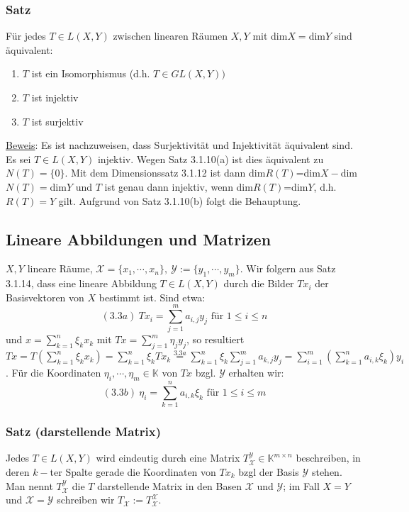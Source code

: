 \subsubsection{Satz}
Für jedes $T\in L(X,Y)$ zwischen linearen Räumen $X,Y$ mit dim$X=$dim$Y$ sind äquivalent:
\renewcommand{\labelenumi}{(\alph{enumi})}
\begin{enumerate}
\item $T$ ist ein Isomorphismus (d.h. $T\in GL(X,Y))$
\item $T$ ist injektiv
\item $T$ ist surjektiv
\end{enumerate}
\underline{Beweis}: Es ist nachzuweisen, dass Surjektivität und Injektivität äquivalent sind.  Es sei $T\in L(X,Y)$ injektiv.  Wegen Satz 3.1.10(a) ist dies äquivalent zu $N(T)=\{0\}$.  Mit dem Dimensionssatz 3.1.12 ist dann dim$R(T)$=dim$X-$dim$N(T)=$dim$Y$ und $T$ ist genau dann injektiv, wenn dim$R(T)$=dim$Y$, d.h. $R(T)=Y$ gilt.  Aufgrund von Satz 3.1.10(b) folgt die Behauptung.
\subsection{Lineare Abbildungen und Matrizen}
$X,Y$ lineare Räume, $\mathcal{X}=\{x_1,\cdots ,x_n\},\ \mathcal{Y}:=\{y_1,\cdots ,y_m\}$.  Wir folgern aus Satz 3.1.14, dass eine lineare Abbildung $T\in L(X,Y)$ durch die Bilder $Tx_i$ der Basisvektoren von $X$ bestimmt ist.  Sind etwa:\\
\[(3.3a)\ Tx_i = \sum_{j=1}^m a_{i,j} y_j\text{ für }1\leq i\leq n\]
und $x=\sum_{k=1}^n\xi _k x_k$ mit $Tx=\sum_{j=1}^m \eta _j y_j$, so resultiert $Tx=T(\sum_{k=1}^n\xi _k x_k)=\sum_{k=1}^n \xi _k Tx_k \stackrel{3.3a}{=} \sum_{k=1}^n\xi _k\sum_{j=1}^ma_{k,j}y_j=\sum_{i=1}^m(\sum_{k=1}^na_{i,k}\xi_k)y_i$.  Für die Koordinaten $\eta _i,\cdots ,\eta _m\in\mathbb{K}$ von $Tx$ bzgl. $\mathcal{Y}$ erhalten wir:\\
\[(3.3b)\ \eta _i=\sum_{k=1}^na_{i,k}\xi _k\text{ für }1\leq i\leq m\]
\subsubsection{Satz (darstellende Matrix)}
Jedes $T\in L(X,Y)$ wird eindeutig durch eine Matrix $T_\mathcal{X}^\mathcal{Y}\in\mathbb{K}^{m\times n}$ beschreiben, in deren $k-$ter Spalte gerade die Koordinaten von $Tx_k$ bzgl der Basis $\mathcal{Y}$ stehen.  Man nennt $T_\mathcal{X}^\mathcal{Y}$ die $T$ darstellende Matrix in den Basen $\mathcal{X}$ und $\mathcal{Y}$; im Fall $X=Y$ und $\mathcal{X}=\mathcal{Y}$ schreiben wir $T_\mathcal{X}:=T^\mathcal{X}_\mathcal{X}$.

